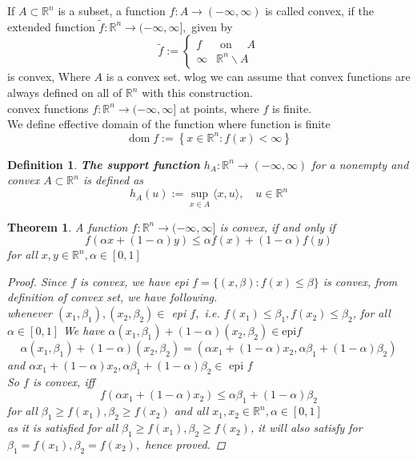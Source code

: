 \documentclass[oneside]{book}
\newtheorem{theorem}{Theorem}[section]
\newtheorem{mydef}{Definition}
\begin{document}
 If $A \subset \mathbb{R}^{n}$ is a subset, a function $f: A \rightarrow(-\infty, \infty)$ is called convex, if the extended function $\tilde{f}: \mathbb{R}^{n} \rightarrow(-\infty, \infty],$ given by
$$
\tilde{f}:=\left\{\begin{array}{ll}
f & \text { on } \quad A \\
\infty & \mathbb{R}^{n} \backslash A
\end{array}\right.
$$
is convex,  Where  $A$ is a convex set. wlog we can assume that convex functions are always defined on all of $\mathbb{R}^{n}$ with this construction.\\
convex functions $f: \mathbb{R}^{n} \rightarrow(-\infty, \infty]$ at points, where $f$ is finite. \\
We define effective domain of the function where function is finite
$$
\operatorname{dom} f:=\left\{x \in \mathbb{R}^{n}: f(x)<\infty\right\}
$$



\begin{mydef}
 \textbf{The support function }$h_{A}: \mathbb{R}^{n} \rightarrow(-\infty, \infty) $  for a nonempty and convex $A \subset \mathbb{R}^{n}$ is defined as
$$
h_{A}(u):=\sup _{x \in A}\langle x, u\rangle, \quad u \in \mathbb{R}^{n}
$$

\end{mydef}




\begin{theorem}
\label{t:7}
 A function $f: \mathbb{R}^{n} \rightarrow(-\infty, \infty]$ is convex, if and only if
$$
f(\alpha x+(1-\alpha) y) \leq \alpha f(x)+(1-\alpha) f(y)
$$
for all $x, y \in \mathbb{R}^{n}, \alpha \in[0,1]$
\begin{proof}

Since $f$ is convex, we have epi $f=\{(x, \beta): f(x) \leq \beta\}$ is convex, from definition of convex set, we have following. \\
whenever $\left(x_{1}, \beta_{1}\right),\left(x_{2}, \beta_{2}\right) \in$ epi $f,$ i.e. $f\left(x_{1}\right) \leq \beta_{1}, f\left(x_{2}\right) \leq \beta_{2}$, for all $\alpha \in[0,1]$
 We have
 $\alpha\left(x_{1}, \beta_{1}\right)+(1-\alpha)\left(x_{2}, \beta_{2}\right) \in \text{epi} f$
 $$
\alpha\left(x_{1}, \beta_{1}\right)+(1-\alpha)\left(x_{2}, \beta_{2}\right)=  \left(\alpha x_{1}+(1-\alpha) x_{2}, \alpha \beta_{1}+(1-\alpha) \beta_{2}\right)
$$
and  $ \alpha x_{1}+(1-\alpha) x_{2}, \alpha \beta_{1}+(1-\alpha) \beta_{2} \in \text { epi } f $
\\
So $f$ is convex, iff
$$
f\left(\alpha x_{1}+(1-\alpha) x_{2}\right) \leq \alpha \beta_{1}+(1-\alpha) \beta_{2}
$$
for   all $ \beta_{1} \geq f\left(x_{1}\right), \beta_{2} \geq f\left(x_{2}\right) $ and  all $ x_{1}, x_{2} \in \mathbb{R}^{n}, \alpha \in[0,1]$ \\
as it is satisfied for all $ \beta_{1} \geq f\left(x_{1}\right), \beta_{2} \geq f\left(x_{2}\right) $, it will also satisfy for $\beta_{1}=f\left(x_{1}\right), \beta_{2}=f\left(x_{2}\right),$  hence proved.  
\end{proof}
\end{theorem} 
\end{document}

